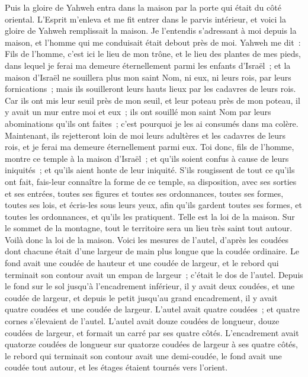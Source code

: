 \begin{multicols}{2}
Puis la gloire de Yahweh entra dans la maison par la porte qui était du côté oriental.
L'Esprit m'enleva et me fit entrer dans le parvis intérieur, et voici la gloire de Yahweh remplissait la maison.
Je l'entendis s'adressant à moi depuis la maison, et l'homme qui me conduisait était debout près de moi.
Yahweh me dit~: Fils de l'homme, c'est ici le lieu de mon trône, et le lieu des plantes de mes pieds, dans lequel je ferai ma demeure éternellement parmi les enfants d'Israël~; et la maison d'Israël ne souillera plus mon saint Nom, ni eux, ni leurs rois, par leurs fornications~; mais ils souilleront leurs hauts lieux par les cadavres de leurs rois.
Car ils ont mis leur seuil près de mon seuil, et leur poteau près de mon poteau, il y avait un mur entre moi et eux~; ils ont souillé mon saint Nom par leurs abominations qu'ils ont faites~; c'est pourquoi je les ai consumés dans ma colère.
Maintenant, ils rejetteront loin de moi leurs adultères et les cadavres de leurs rois, et je ferai ma demeure éternellement parmi eux.
Toi donc, fils de l'homme, montre ce temple à la maison d'Israël~; et qu'ils soient confus à cause de leurs iniquités~; et qu'ils aient honte de leur iniquité.
S'ils rougissent de tout ce qu'ils ont fait, fais-leur connaître la forme de ce temple, sa disposition, avec ses sorties et ses entrées, toutes ses figures et toutes ses ordonnances, toutes ses formes, toutes ses lois, et écris-les sous leurs yeux, afin qu'ils gardent toutes ses formes, et toutes les ordonnances, et qu'ils les pratiquent.
Telle est la loi de la maison. Sur le sommet de la montagne, tout le territoire sera un lieu très saint tout autour. Voilà donc la loi de la maison.
Voici les mesures de l'autel, d'après les coudées dont chacune était d'une largeur de main plus longue que la coudée ordinaire. Le fond avait une coudée de hauteur et une coudée de largeur, et le rebord qui terminait son contour avait un empan de largeur~; c'était le dos de l'autel.
Depuis le fond sur le sol jusqu'à l'encadrement inférieur, il y avait deux coudées, et une coudée de largeur, et depuis le petit jusqu'au grand encadrement, il y avait quatre coudées et une coudée de largeur.
L'autel avait quatre coudées~; et quatre cornes s'élevaient de l'autel.
L'autel avait douze coudées de longueur, douze coudées de largeur, et formait un carré par ses quatre côtés.
L'encadrement avait quatorze coudées de longueur sur quatorze coudées de largeur à ses quatre côtés, le rebord qui terminait son contour avait une demi-coudée, le fond avait une coudée tout autour, et les étages étaient tournés vers l'orient.

\end{multicols}
